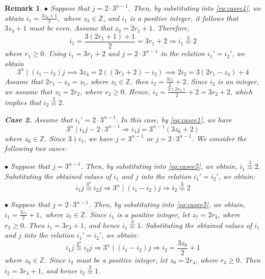 \documentclass[12pt]{article}
\newtheorem{remA}[propA]{Remark}
\begin{document}
\begin{remA}
$\bullet$ Suppose that \(j=2 \cdot 3^{\alpha-1}\). Then, by substituting into \eqref{eq:casee4}, we obtain $i_1=\frac{3z_3+1}{2},$
where \(z_3\in\mathbb{Z}\), and \(i_1\) is a positive integer, it follows that \(3z_3+1\) must be even.
Assume that \(z_3=2r_1+1\). Therefore,
\[
i_1=\frac{3(2r_1+1)+1}{2}=3r_1+2
\Longrightarrow
i_1\stackrel{3}{\equiv}2
\]
where \(r_1\geq 0\). Using \(i_1=3r_1+2\) and \(j=2 \cdot3^{\alpha-1}\) in the relation \(i_1'=i_2'\), we obtain
\[
3^\alpha \mid (i_1 - i_2)j \implies 3z_4 = 2((3r_1 + 2) - i_2) \implies 2i_2 = 3(2r_1 - z_4) + 4
\]
Assume that \(2r_1-z_4=z_5\), where \(z_5\in\mathbb{Z}\), then \(i_2=\frac{3z_5}{2}+2\). Since \(i_2\) is an integer, we assume that \(z_5=2r_2\), where \(r_2\geq0\). Hence, \(i_2=\frac{3(2r_2)}{2}+2=3r_2+2\), which implies that \(i_2\stackrel{3}{\equiv}2\).

\textbf{Case 2.} Assume that \(i_1'=2\cdot 3^{\alpha-1}\). In this case, by \eqref{eq:casee1}, we have
\begin{equation}\label{eq:casee5}
	3^\alpha\mid i_1j-2\cdot3^{\alpha-1}
	\Longrightarrow
	i_1j=3^{\alpha-1}(3z_6+2)
\end{equation}
where \(z_6\in\mathbb{Z}\). Since \(3\nmid i_1\), we have \(j=3^{\alpha-1}\) or \(j=2\cdot3^{\alpha-1}\). We consider the following two cases:

$\bullet$ Suppose that \(j=3^{\alpha-1}\). Then, by substituting into \eqref{eq:casee5}, we obtain, $i_1\stackrel{3}{\equiv}2$. Substituting the obtained values of \(i_1\) and \(j\) into the relation \(i_1'=i_2'\), we obtain:
\[
i_1j\stackrel{3^\alpha}{\equiv} i_2j
\Longrightarrow
3^\alpha\mid (i_1-i_2)j
\Longrightarrow
i_2\stackrel{3}{\equiv}2
\]

$\bullet$ Suppose that \(j=2\cdot3^{\alpha-1}\). Then, by substituting into \eqref{eq:casee5}, we obtain, $i_1=\frac{3z_7}{2}+1,$
where \(z_7\in\mathbb{Z}\). Since \(i_1\) is a positive integer, let \(z_7=2r_3\), where \(r_3\geq0\). Then \(i_1=3r_3+1\), and hence $i_1\stackrel{3}{\equiv}1$. Substituting the obtained values of \(i_1\) and \(j\) into the relation \(i_1'=i_2'\), we obtain:
\[
i_1j\stackrel{3^\alpha}{\equiv} i_2j
\Longrightarrow
3^\alpha\mid (i_1-i_2)j
\Longrightarrow
i_2=\frac{3z_8}{2}+1
\]
where \(z_8\in\mathbb{Z}\). Since \(i_2\) must be a positive integer, let \(z_8=2r_4\), where \(r_4\geq0\). Then \(i_2=3r_4+1\), and hence $i_2\stackrel{3}{\equiv}1$.


\end{remA}
\end{document}
